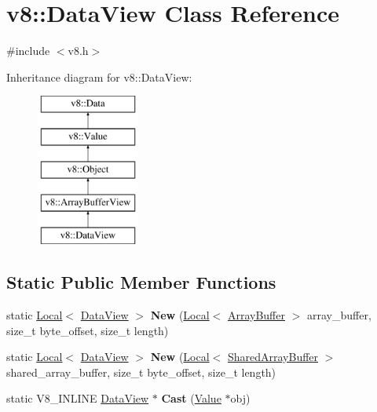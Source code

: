 \hypertarget{classv8_1_1DataView}{}\section{v8\+:\+:Data\+View Class Reference}
\label{classv8_1_1DataView}


{\ttfamily \#include $<$v8.\+h$>$}

Inheritance diagram for v8\+:\+:Data\+View\+:\begin{figure}[H]
\begin{center}
\leavevmode
\includegraphics[height=5.000000cm]{classv8_1_1DataView}
\end{center}
\end{figure}
\subsection*{Static Public Member Functions}
\begin{DoxyCompactItemize}
\item 
\hypertarget{classv8_1_1DataView_a40dcfc9ed56dbc41f48ddc49271cbab0}{}static \hyperlink{classv8_1_1Local}{Local}$<$ \hyperlink{classv8_1_1DataView}{Data\+View} $>$ {\bfseries New} (\hyperlink{classv8_1_1Local}{Local}$<$ \hyperlink{classv8_1_1ArrayBuffer}{Array\+Buffer} $>$ array\+\_\+buffer, size\+\_\+t byte\+\_\+offset, size\+\_\+t length)\label{classv8_1_1DataView_a40dcfc9ed56dbc41f48ddc49271cbab0}

\item 
\hypertarget{classv8_1_1DataView_a8310e075564dd9f26122be2733995ba2}{}static \hyperlink{classv8_1_1Local}{Local}$<$ \hyperlink{classv8_1_1DataView}{Data\+View} $>$ {\bfseries New} (\hyperlink{classv8_1_1Local}{Local}$<$ \hyperlink{classv8_1_1SharedArrayBuffer}{Shared\+Array\+Buffer} $>$ shared\+\_\+array\+\_\+buffer, size\+\_\+t byte\+\_\+offset, size\+\_\+t length)\label{classv8_1_1DataView_a8310e075564dd9f26122be2733995ba2}

\item 
\hypertarget{classv8_1_1DataView_aa97d15fcb28c6c002a52d32877c8fd3a}{}static V8\+\_\+\+I\+N\+L\+I\+N\+E \hyperlink{classv8_1_1DataView}{Data\+View} $\ast$ {\bfseries Cast} (\hyperlink{classv8_1_1Value}{Value} $\ast$obj)\label{classv8_1_1DataView_aa97d15fcb28c6c002a52d32877c8fd3a}

\end{DoxyCompactItemize}
